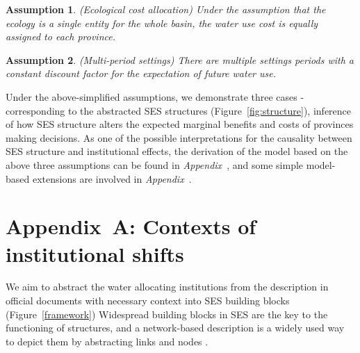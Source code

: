 \documentclass[default, sn-standardnature]{sn-jnl}
\newtheorem{ass}{Assumption}
\begin{document}
\begin{ass}
    (Ecological cost allocation) Under the assumption that the ecology is a single entity for the whole basin, the water use cost is equally assigned to each province.
\end{ass}

\begin{ass}
    (Multi-period settings) There are multiple settings periods with a constant discount factor for the expectation of future water use.
\end{ass}

Under the above-simplified assumptions, we demonstrate three cases -corresponding to the abstracted SES structures (Figure~\ref{fig:structure}), inference of how SES structure alters the expected marginal benefits and costs of provinces making decisions.
As one of the possible interpretations for the causality between SES structure and institutional effects, the derivation of the model based on the above three assumptions can be found in \textit{Appendix~}, and some simple model-based extensions are involved in \textit{Appendix~}.




\label{bib}

\newpage
\appendix
\label{appendix}
\renewcommand{\figurename}{Supplementary Figure}
\renewcommand{\appendixname}{Appendix~\Alph{section}}
\setcounter{section}{0}

\section{Appendix~A: Contexts of institutional shifts}\label{secS1}
\renewcommand{\thefigure}{A\arabic{figure}}
\renewcommand{\thetable}{A\arabic{table}}
\setcounter{figure}{0}
\setcounter{table}{0}

We aim to abstract the water allocating institutions from the description in official documents with necessary context into SES building blocks (Figure~\ref{framework})
Widespread building blocks in SES are the key to the functioning of structures, and a network-based description is a widely used way to depict them by abstracting links and nodes \cite{bodin2017a,kluger2020,guerrero2015}.
\end{document}

